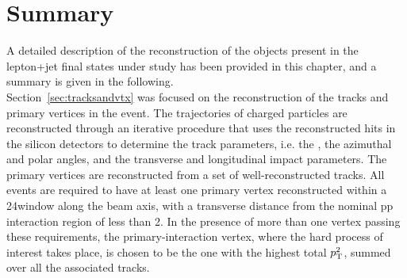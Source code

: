  

 

  
 
   

\section{Summary}

A detailed description of the reconstruction of the objects present in the lepton+jet final states under study has been provided in this chapter, and a summary is given in the following.\\

Section~\ref{sec:tracksandvtx} was focused on the reconstruction of the tracks and primary vertices in the event.
The trajectories of charged particles are reconstructed through an iterative procedure that uses the reconstructed hits in the silicon detectors to determine the track parameters, i.e. the \pt, the azimuthal and polar angles, and the transverse and longitudinal impact parameters.
The primary vertices are reconstructed from a set of well-reconstructed tracks.
All events are required to have at least one primary vertex reconstructed within a 24\cm window along the beam axis, with a transverse distance from the nominal pp interaction region of less than 2\cm. In the presence of more than one vertex passing these requirements, the primary-interaction vertex, where the hard process of interest takes place, is chosen to be the one with the highest total $p_{\mathrm{T}}^2$, summed over all the associated tracks.\\

